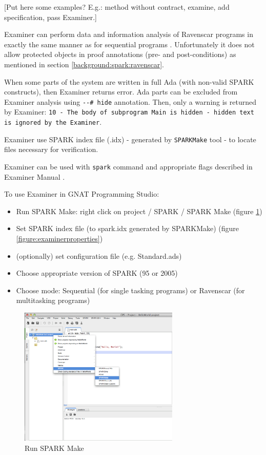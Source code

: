 [Put here some examples? E.g.: method without contract, examine, add specification, pass Examiner.]

Examiner can perform data and information analysis of Ravenscar programs in exactly the same manner as for sequential programs \cite{Ravenscar:Online}. Unfortunately it does not allow protected objects in proof annotations (pre- and post-conditions) as mentioned in section \ref{background:spark:ravenscar}.

When some parts of the system are written in full Ada (with non-valid SPARK constructs), then Examiner returns error. Ada parts can be excluded from Examiner analysis using \lstinline{--# hide} annotation. Then, only a warning is returned by Examiner: \lstinline{10 - The body of subprogram Main is hidden - hidden text is ignored by the Examiner}.

Examiner use SPARK index file (.idx) - generated by \lstinline{SPARKMake} tool -  to locate files necessary for verification. \cite{Barnes:Book}

Examiner can be used with \lstinline{spark} command and appropriate flags described in Examiner Manual \cite{Examiner:Online}.


To use Examiner in GNAT Programming Studio:
\begin{itemize}
	\item Run SPARK Make: right click on project / SPARK / SPARK Make (figure \ref{figure:sparkmake})
	\item Set SPARK index file (to spark.idx generated by SPARKMake) (figure \ref{figure:examinerproperties})
	\item (optionally) set configuration file (e.g. Standard.ads)
	\item Choose appropriate version of SPARK (95 or 2005)
	\item Choose mode: Sequential (for single tasking programs) or Ravenscar (for multitasking programs)
\end{itemize}

\begin{figure}[ht]%
    \begin{center}
    	\includegraphics[width=3in]{figures/SPARKMake.png}    	
    \end{center}
    \caption{Run SPARK Make}
    \label{figure:sparkmake}
\end{figure}


